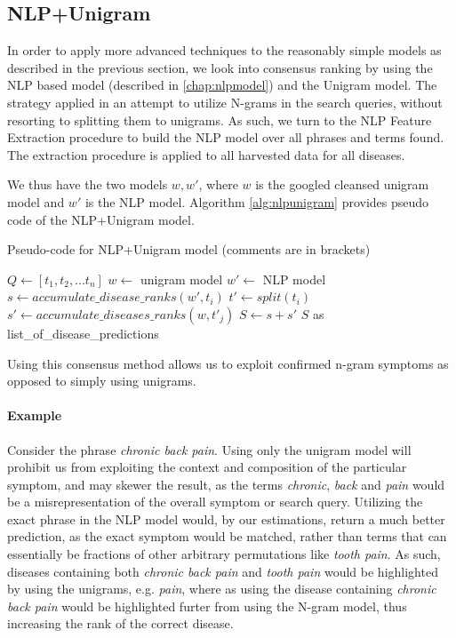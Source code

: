 \documentclass[10pt,letterpaper,two column,final]{article}
\begin{document}
\subsection{NLP+Unigram}
In order to apply more advanced techniques to the reasonably simple
models as described in the previous section, we look into consensus
ranking by using the NLP based model (described in \ref{chap:nlpmodel}) and the Unigram model.
The strategy applied in an attempt to utilize N-grams in the search
queries, without resorting to splitting them to unigrams. As such, we
turn to the NLP Feature Extraction procedure to build the NLP model over
all phrases and terms found. The extraction procedure is applied to
all harvested data for all diseases.

We thus have the two models $w, w'$, where $w$ is the googled cleansed
unigram model and $w'$ is the NLP model. Algorithm \ref{alg:nlpunigram}
provides pseudo code of the NLP+Unigram model.

\begin{algorithm}
\caption{Pseudo-code for NLP+Unigram model (comments are in brackets)}
\begin{algorithmic}

\STATE $Q \gets [t_{1}, t_{2}, ... t_{n}]$ 
\STATE $w \gets$ unigram model
\STATE $w' \gets$ NLP model
        \STATE $s \gets accumulate\_disease\_ranks(w', t_{i})$ 
    \ENDIF
    \STATE $t' \gets split(t_{i})$ %
        \STATE $s' \gets accumulate\_diseases\_ranks(w, t'_{j})$
    \ENDFOR
    \STATE $S \gets s + s'$
\ENDFOR
\RETURN $S$ as list\_of\_disease\_predictions

\end{algorithmic}
\label{alg:nlpunigram}
\end{algorithm}

Using this consensus method allows us to exploit confirmed n-gram
symptoms as opposed to simply using unigrams.

\paragraph{Example} Consider the phrase \textit{chronic back pain}.
Using only the unigram model will prohibit us from exploiting the
context and composition of the particular symptom, and may skewer the
result, as the terms \textit{chronic}, \textit{back} and \textit{pain}
would be a misrepresentation of the overall symptom or search query.
Utilizing the exact phrase in the NLP model would, by our estimations,
return a much better prediction, as the exact symptom would be matched,
rather than terms that can essentially be fractions of other arbitrary
permutations like \textit{tooth pain}. As such, diseases containing both
\textit{chronic back pain} and \textit{tooth pain} would be highlighted
by using the unigrams, e.g. \textit{pain}, where as using the disease
containing \textit{chronic back pain} would be highlighted furter from
using the N-gram model, thus increasing the rank of the correct disease.
\newline
\end{document}
